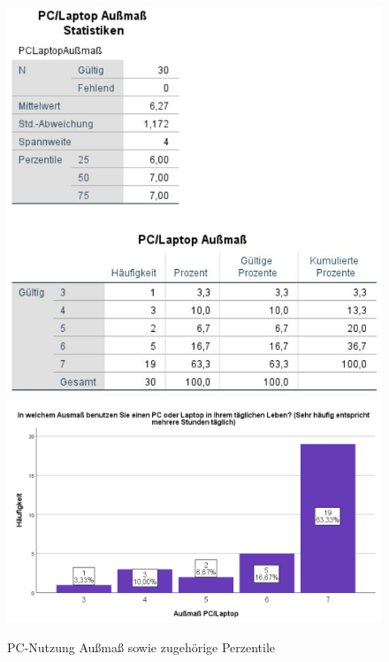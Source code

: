 \documentclass[a4paper,11pt]{article}%
\renewcommand{\\}{\vspace*{0.5\baselineskip} \newline}
\begin{document}
	\begin{figure}[H]
	\centering
		\begin{footnotesize}
			\includegraphics[scale=0.6]{Abbildungen/Pre_QuestionnaireStatistiks/teilnehmerPCAußmaß}\\
			\includegraphics[scale=0.5]{Abbildungen/Demographie/teilnehmerPCAußmaß}\\
			\caption{PC-Nutzung Außmaß sowie zugehörige Perzentile}
			\label{fig:teilnehmerPCAußmaß}
		\end{footnotesize}
	\end{figure}		
	
\end{document}
